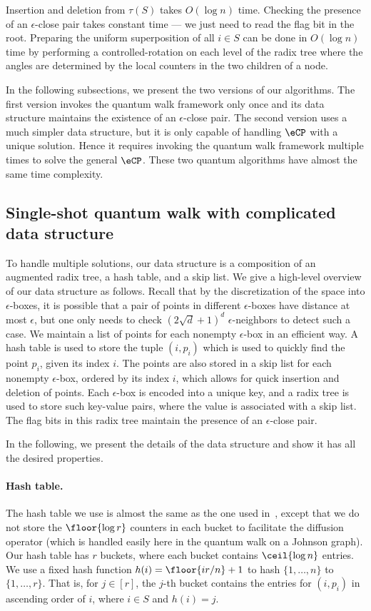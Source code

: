 Insertion and deletion from $\tau(S)$ takes $O(\log n)$ time. Checking the presence of an $\epsilon$-close pair takes constant time --- we just need to read the flag bit in the root. Preparing the uniform superposition of all $i \in S$ can be done in $O(\log n)$ time by performing a controlled-rotation on each level of the radix tree where the angles are determined by the local counters in the two children of a node.

In the following subsections, we present the two versions of our algorithms. The first version invokes the quantum walk framework only once and its data structure maintains the existence of an $\epsilon$-close pair. The second version uses a much simpler data structure, but it is only capable of handling $\eCP$ with a unique solution. Hence it requires invoking the quantum walk framework multiple times to solve the general $\eCP$. These two quantum algorithms have almost the same time complexity. 

\subsection{Single-shot quantum walk with complicated data structure}
\label{sec:one-shot}
To handle multiple solutions, our data structure is a composition of an augmented radix tree, a hash table, and a skip list. We give a high-level overview of our data structure as follows. Recall that by the discretization of the space into $\epsilon$-boxes,  it is possible that a pair of points in different $\epsilon$-boxes have distance at most $\epsilon$, but one only needs to check $(2\sqrt{d}+1)^d$ $\epsilon$-neighbors to detect such a case. We maintain a list of points for each nonempty $\epsilon$-box in an efficient way. A hash table is used to store the tuple $(i, p_i)$ which is used to quickly find the point $p_i$, given its index $i$. The points are also stored in a skip list for each nonempty $\epsilon$-box, ordered by its index $i$, which allows for quick insertion and deletion of points. Each $\epsilon$-box is encoded into a unique key, and a radix tree is used to store such key-value pairs, where the value is associated with a skip list. The flag bits in this radix tree maintain the presence of an $\epsilon$-close pair.

In the following, we present the details of the data structure and show it has all the desired properties.

\paragraph{Hash table.}
The hash table we use is almost the same as the one used in~\cite{r5}, except that we do not store the $\floor{\log r}$ counters in each bucket to facilitate the diffusion operator (which is handled easily here in the quantum walk on a Johnson graph). Our hash table has $r$ buckets, where each bucket contains $\ceil{\log n}$ entries. We use a fixed hash function $h(i) = \floor{ir/n}+1$ to hash $\{1, \ldots, n\}$ to $\{1, \ldots, r\}$. That is, for $j\in [r]$, the $j$-th bucket contains the entries for $(i, p_i)$ in ascending order of $i$, where $i \in S$ and $h(i) = j$. 

